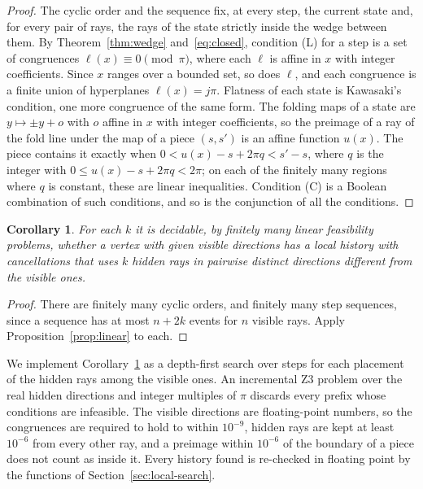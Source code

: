 \documentclass[11pt]{article}
\newtheorem{corollary}[theorem]{Corollary}
\theoremstyle{definition}
\theoremstyle{remark}
\begin{document}
\begin{proof}
The cyclic order and the sequence fix, at every step, the current state and, for every pair of rays, the rays of the state strictly inside the wedge between them. By Theorem~\ref{thm:wedge} and~\eqref{eq:closed}, condition (L) for a step is a set of congruences $\ell(x)\equiv0\pmod\pi$, where each $\ell$ is affine in $x$ with integer coefficients. Since $x$ ranges over a bounded set, so does $\ell$, and each congruence is a finite union of hyperplanes $\ell(x)=j\pi$. Flatness of each state is Kawasaki's condition, one more congruence of the same form. The folding maps of a state are $y\mapsto\pm y+o$ with $o$ affine in $x$ with integer coefficients, so the preimage of a ray of the fold line under the map of a piece $(s,s')$ is an affine function $u(x)$. The piece contains it exactly when $0<u(x)-s+2\pi q<s'-s$, where $q$ is the integer with $0\le u(x)-s+2\pi q<2\pi$; on each of the finitely many regions where $q$ is constant, these are linear inequalities. Condition (C) is a Boolean combination of such conditions, and so is the conjunction of all the conditions.
\end{proof}

\begin{corollary}\label{cor:decide}
For each $k$ it is decidable, by finitely many linear feasibility problems, whether a vertex with given visible directions has a local history with cancellations that uses $k$ hidden rays in pairwise distinct directions different from the visible ones.
\end{corollary}

\begin{proof}
There are finitely many cyclic orders, and finitely many step sequences, since a sequence has at most $n+2k$ events for $n$ visible rays. Apply Proposition~\ref{prop:linear} to each.
\end{proof}

We implement Corollary~\ref{cor:decide} as a depth-first search over steps for each placement of the hidden rays among the visible ones. An incremental Z3 problem over the real hidden directions and integer multiples of $\pi$ discards every prefix whose conditions are infeasible. The visible directions are floating-point numbers, so the congruences are required to hold to within $10^{-9}$, hidden rays are kept at least $10^{-6}$ from every other ray, and a preimage within $10^{-6}$ of the boundary of a piece does not count as inside it. Every history found is re-checked in floating point by the functions of Section~\ref{sec:local-search}.
\end{document}

